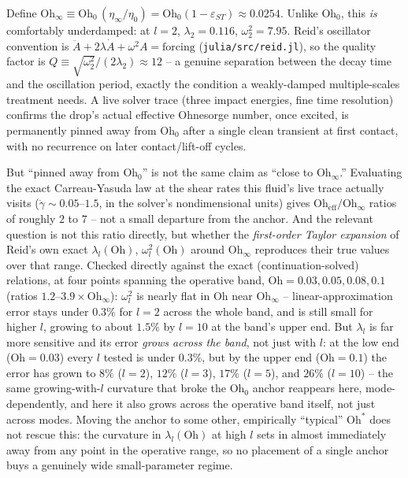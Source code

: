 \begin{derivbox}
Define $\mathrm{Oh}_\infty\equiv\mathrm{Oh}_0\,(\eta_\infty/\eta_0) =
\mathrm{Oh}_0(1-\varepsilon_{ST})\approx 0.0254$. Unlike $\mathrm{Oh}_0$,
this \emph{is} comfortably underdamped: at $l=2$,
$\lambda_2=0.116$, $\omega_2^2=7.95$. Reid's oscillator convention is
$\ddot A+2\lambda\dot A+\omega^2A=\text{forcing}$
(\texttt{julia/src/reid.jl}), so the quality factor is
$Q\equiv\sqrt{\omega_2^2}/(2\lambda_2)\approx 12$ -- a genuine separation
between the decay time and the oscillation period, exactly the condition a
weakly-damped multiple-scales treatment needs. A live solver trace (three
impact energies, fine time resolution) confirms the drop's actual effective
Ohnesorge number, once excited, is permanently pinned away from
$\mathrm{Oh}_0$ after a single clean transient at first contact, with no
recurrence on later contact/lift-off cycles.

But ``pinned away from $\mathrm{Oh}_0$'' is not the same claim as ``close to
$\mathrm{Oh}_\infty$.'' Evaluating the exact Carreau-Yasuda law at the shear
rates this fluid's live trace actually visits ($\dot\gamma\sim
0.05$--$1.5$, in the solver's nondimensional units) gives
$\mathrm{Oh}_{\mathrm{eff}}/\mathrm{Oh}_\infty$ ratios of roughly $2$ to
$7$ -- not a small departure from the anchor. And the relevant question is
not this ratio directly, but whether the \emph{first-order Taylor expansion}
of Reid's own exact $\lambda_l(\mathrm{Oh})$, $\omega_l^2(\mathrm{Oh})$
around $\mathrm{Oh}_\infty$ reproduces their true values over that range.
Checked directly against the exact (continuation-solved) relations, at four
points spanning the operative band, $\mathrm{Oh}=0.03,0.05,0.08,0.1$
(ratios $1.2$--$3.9\times\mathrm{Oh}_\infty$): $\omega_l^2$ is nearly flat in
$\mathrm{Oh}$ near $\mathrm{Oh}_\infty$ -- linear-approximation error stays
under $0.3\%$ for $l=2$ across the whole band, and is still small for
higher $l$, growing to about $1.5\%$ by $l=10$ at the band's upper end. But
$\lambda_l$ is far more sensitive and its error \emph{grows across the
band}, not just with $l$: at the low end ($\mathrm{Oh}=0.03$) every $l$
tested is under $0.3\%$, but by the upper end ($\mathrm{Oh}=0.1$) the error
has grown to $8\%$ ($l=2$), $12\%$ ($l=3$), $17\%$ ($l=5$), and $26\%$
($l=10$) -- the same growing-with-$l$ curvature that broke the
$\mathrm{Oh}_0$ anchor reappears here, mode-dependently, and here it also
grows across the operative band itself, not just across modes.
Moving the anchor to some other, empirically ``typical'' $\mathrm{Oh}^\ast$
does not rescue this: the curvature in $\lambda_l(\mathrm{Oh})$ at high $l$
sets in almost immediately away from any point in the operative range, so no
placement of a single anchor buys a genuinely wide small-parameter regime.
\end{derivbox}


